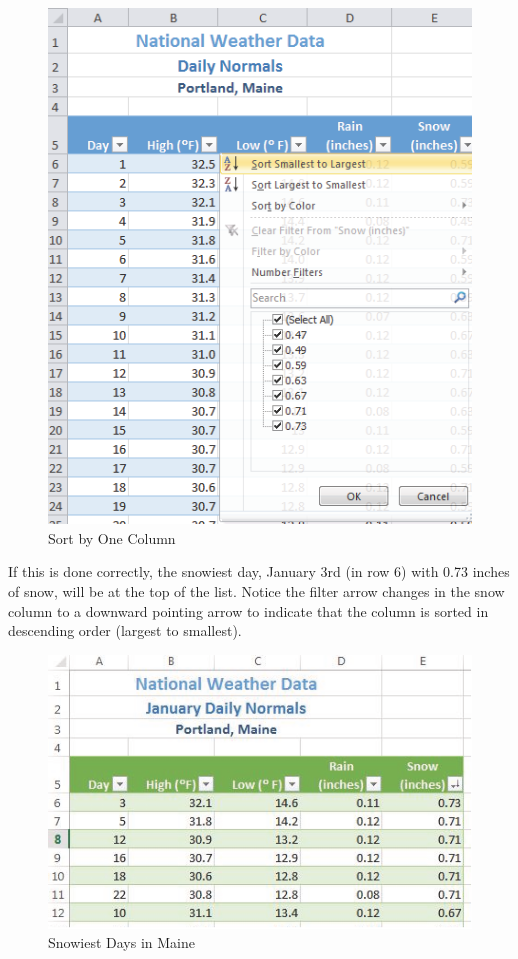 \begin{figure}[H]
	\centering
	\includegraphics[width=\maxwidth{.95\linewidth}]{gfx/ch05_fig08}
	\caption{Sort by One Column}
	\label{05:fig08}
\end{figure}

If this is done correctly, the snowiest day, January 3rd (in row 6) with 0.73 inches of snow, will be at the top of the list. Notice the filter arrow changes in the snow column to a downward pointing arrow to indicate that the column is sorted in descending order (largest to smallest).

\begin{figure}[H]
	\centering
	\includegraphics[width=\maxwidth{.95\linewidth}]{gfx/ch05_fig09}
	\caption{Snowiest Days in Maine}
	\label{05:fig09}
\end{figure}

